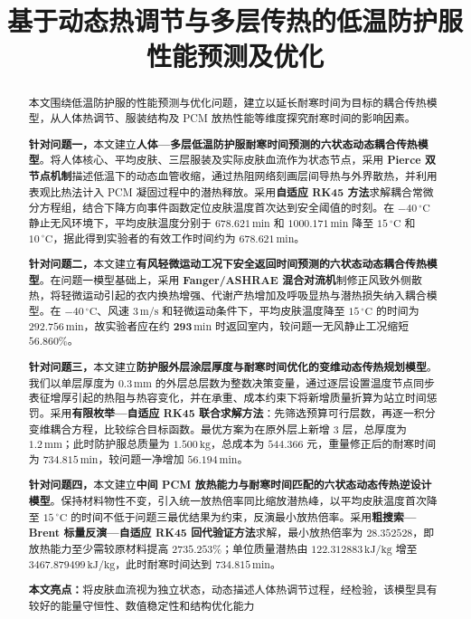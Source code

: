 \documentclass[withoutpreface,bwprint]{cumcmthesis}
\title{基于动态热调节与多层传热的低温防护服性能预测及优化}
\begin{document}
\maketitle
\thispagestyle{empty}
\begin{abstract}\setlength{\parskip}{0.3\baselineskip}
本文围绕低温防护服的性能预测与优化问题，建立以延长耐寒时间为目标的耦合传热模型，从人体热调节、服装结构及 PCM 放热性能等维度探究耐寒时间的影响因素。

\textbf{针对问题一，}本文建立\textbf{人体—多层低温防护服耐寒时间预测的六状态动态耦合传热模型}。将人体核心、平均皮肤、三层服装及实际皮肤血流作为状态节点，采用 \textbf{Pierce 双节点机制}描述低温下的动态血管收缩，通过热阻网络刻画层间导热与外界散热，并利用表观比热法计入 PCM 凝固过程中的潜热释放。采用\textbf{自适应 RK45 方法}求解耦合常微分方程组，结合下降方向事件函数定位皮肤温度首次达到安全阈值的时刻。在 \(-40\,^{\circ}\mathrm C\) 静止无风环境下，平均皮肤温度分别于 \(\bm{678.621\,\mathrm{min}}\) 和 \(\bm{1000.171\,\mathrm{min}}\) 降至 \(15\,^{\circ}\mathrm C\) 和 \(10\,^{\circ}\mathrm C\)，据此得到实验者的有效工作时间约为 \(\bm{678.621\,\mathrm{min}}\)。


\textbf{针对问题二，}本文建立\textbf{有风轻微运动工况下安全返回时间预测的六状态动态耦合传热模型}。在问题一模型基础上，采用 \textbf{Fanger/ASHRAE 混合对流机}制修正风致外侧散热，将轻微运动引起的衣内换热增强、代谢产热增加及呼吸显热与潜热损失纳入耦合模型。在 \(-40\,^{\circ}\mathrm C\)、风速 \(3\,\mathrm{m/s}\) 和轻微运动条件下，平均皮肤温度降至 \(15\,^{\circ}\mathrm C\) 的时间为 \(\bm{292.756\,\mathrm{min}}\)，故实验者应在约 \(\bm{293\,\mathrm{min}}\) 时返回室内，较问题一无风静止工况缩短 \(\bm{56.860\%}\)。

\textbf{针对问题三，}本文建立\textbf{防护服外层涂层厚度与耐寒时间优化的变维动态传热规划模型}。我们以单层厚度为 $0.3\,\mathrm{mm}$ 的外层总层数为整数决策变量，通过逐层设置温度节点同步表征增厚引起的热阻与热容变化，并在承重、成本约束下将新增质量折算为站立时间惩罚。采用\textbf{有限枚举—自适应 RK45 联合求解方法}：先筛选预算可行层数，再逐一积分变维耦合方程，比较综合目标函数。最优方案为在原外层上新增 $3$ 层，总厚度为 $1.2\,\mathrm{mm}$；此时防护服总质量为 $1.500\,\mathrm{kg}$，总成本为 $544.366$ 元，重量修正后的耐寒时间为 $\bm{734.815\,\mathrm{min}}$，较问题一净增加 $\bm{56.194\,\mathrm{min}}$。

\textbf{针对问题四，}本文建立\textbf{中间 PCM 放热能力与耐寒时间匹配的六状态动态传热逆设计模型}。保持材料物性不变，引入统一放热倍率同比缩放潜热峰，以平均皮肤温度首次降至 $15\,^{\circ}\mathrm C$ 的时间不低于问题三最优结果为约束，反演最小放热倍率。采用\textbf{粗搜索—Brent 标量反演—自适应 RK45 回代验证方法}求解，最小放热倍率为 $\bm{28.352528}$，即放热能力至少需较原材料提高 $\bm{2735.253\%}$；单位质量潜热由 $122.312883\,\mathrm{kJ/kg}$ 增至 $3467.879499\,\mathrm{kJ/kg}$，此时耐寒时间达到 $\bm{734.815\,\mathrm{min}}$。

\textbf{本文亮点：}将皮肤血流视为独立状态，动态描述人体热调节过程，经检验，该模型具有较好的能量守恒性、数值稳定性和结构优化能力

\end{abstract}
\thispagestyle{empty}
\setcounter{page}{1} 
\end{document}
